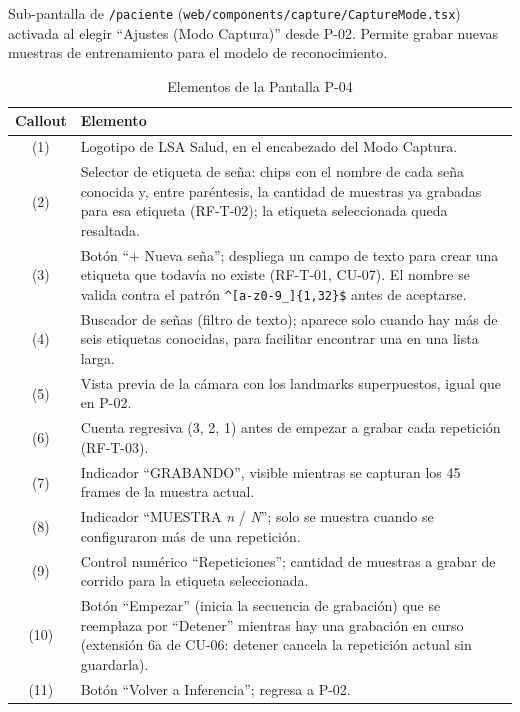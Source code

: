Sub-pantalla de \texttt{/paciente} (\texttt{web/components/capture/CaptureMode.tsx})
activada al elegir ``Ajustes (Modo Captura)'' desde P-02. Permite grabar
nuevas muestras de entrenamiento para el modelo de reconocimiento.


\begin{table}[H]
    \centering
    \caption{Elementos de la Pantalla P-04}
    \label{tab:mock-p04}
    \begin{tabularx}{\textwidth}{c X}
        \toprule
        \textbf{Callout} & \textbf{Elemento} \\
        \midrule
        (1) & Logotipo de LSA Salud, en el encabezado del Modo Captura. \\
        (2) & Selector de etiqueta de seña: chips con el nombre de cada
        seña conocida y, entre paréntesis, la cantidad de muestras ya
        grabadas para esa etiqueta (RF-T-02); la etiqueta seleccionada
        queda resaltada. \\
        (3) & Botón ``+ Nueva seña''; despliega un campo de texto para
        crear una etiqueta que todavía no existe (RF-T-01, CU-07). El
        nombre se valida contra el patrón \texttt{\^{}[a-z0-9\_]\{1,32\}\$}
        antes de aceptarse. \\
        (4) & Buscador de señas (filtro de texto); aparece solo cuando hay
        más de seis etiquetas conocidas, para facilitar encontrar una en
        una lista larga. \\
        (5) & Vista previa de la cámara con los landmarks superpuestos,
        igual que en P-02. \\
        (6) & Cuenta regresiva (3, 2, 1) antes de empezar a grabar cada
        repetición (RF-T-03). \\
        (7) & Indicador ``GRABANDO'', visible mientras se capturan los 45
        frames de la muestra actual. \\
        (8) & Indicador ``MUESTRA \emph{n} / \emph{N}''; solo se muestra
        cuando se configuraron más de una repetición. \\
        (9) & Control numérico ``Repeticiones''; cantidad de muestras a
        grabar de corrido para la etiqueta seleccionada. \\
        (10) & Botón ``Empezar'' (inicia la secuencia de grabación) que se
        reemplaza por ``Detener'' mientras hay una grabación en curso
        (extensión 6a de CU-06: detener cancela la repetición actual sin
        guardarla). \\
        (11) & Botón ``Volver a Inferencia''; regresa a P-02. \\
        \bottomrule
    \end{tabularx}
\end{table}

